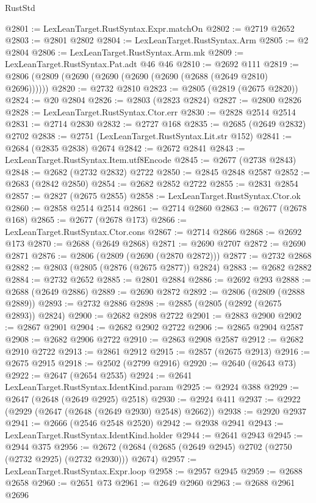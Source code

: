 \begin{lexlean}{RustStd}
\begin{coremodule}
@2801 := LexLeanTarget.RustSyntax.Expr.matchOn
@2802 := @2719 @2652
@2803 := @2801 @2802
@2804 := LexLeanTarget.RustSyntax.Arm
@2805 := @2 @2804
@2806 := LexLeanTarget.RustSyntax.Arm.mk
@2809 := LexLeanTarget.RustSyntax.Pat.adt @46 @46
@2810 := @2692 @111
@2819 := @2806 (@2809 (@2690 (@2690 (@2690 (@2690 (@2688 (@2649 @2810) @2696))))))
@2820 := @2732 @2810
@2823 := @2805 (@2819 (@2675 @2820))
@2824 := @20 @2804
@2826 := @2803 (@2823 @2824)
@2827 := @2800 @2826
@2828 := LexLeanTarget.RustSyntax.Ctor.err
@2830 := @2828 @2514 @2514
@2831 := @2714 @2830
@2832 := @2727 @168
@2835 := @2685 (@2649 @2832) @2702
@2838 := @2751 (LexLeanTarget.RustSyntax.Lit.str @152)
@2841 := @2684 (@2835 @2838) @2674
@2842 := @2672 @2841
@2843 := LexLeanTarget.RustSyntax.Item.utf8Encode
@2845 := @2677 (@2738 @2843)
@2848 := @2682 (@2732 @2832) @2722
@2850 := @2845 @2848 @2587
@2852 := @2683 (@2842 @2850)
@2854 := @2682 @2852 @2722
@2855 := @2831 @2854
@2857 := @2827 (@2675 @2855)
@2858 := LexLeanTarget.RustSyntax.Ctor.ok
@2860 := @2858 @2514 @2514
@2861 := @2714 @2860
@2863 := @2677 (@2678 @168)
@2865 := @2677 (@2678 @173)
@2866 := LexLeanTarget.RustSyntax.Ctor.cons
@2867 := @2714 @2866
@2868 := @2692 @173
@2870 := @2688 (@2649 @2868)
@2871 := @2690 @2707
@2872 := @2690 @2871
@2876 := @2806 (@2809 (@2690 (@2870 @2872)))
@2877 := @2732 @2868
@2882 := @2803 (@2805 (@2876 (@2675 @2877)) @2824)
@2883 := @2682 @2882
@2884 := @2732 @2652
@2885 := @2801 @2884
@2886 := @2692 @293
@2888 := @2688 (@2649 @2886)
@2889 := @2690 @2872
@2892 := @2806 (@2809 (@2888 @2889))
@2893 := @2732 @2886
@2898 := @2885 (@2805 (@2892 (@2675 @2893)) @2824)
@2900 := @2682 @2898 @2722
@2901 := @2883 @2900
@2902 := @2867 @2901
@2904 := @2682 @2902 @2722
@2906 := @2865 @2904 @2587
@2908 := @2682 @2906 @2722
@2910 := @2863 @2908 @2587
@2912 := @2682 @2910 @2722
@2913 := @2861 @2912
@2915 := @2857 (@2675 @2913)
@2916 := @2675 @2915
@2918 := @2502 (@2799 @2916)
@2920 := @2640 (@2643 @73)
@2922 := @2647 (@2654 @2535)
@2924 := @2641 LexLeanTarget.RustSyntax.IdentKind.param
@2925 := @2924 @388
@2929 := @2647 (@2648 (@2649 @2925) @2518)
@2930 := @2924 @411
@2937 := @2922 (@2929 (@2647 (@2648 (@2649 @2930) @2548) @2662))
@2938 := @2920 @2937
@2941 := @2666 (@2546 @2548 @2520)
@2942 := @2938 @2941
@2943 := LexLeanTarget.RustSyntax.IdentKind.holder
@2944 := @2641 @2943
@2945 := @2944 @375
@2956 := @2672 (@2684 (@2685 (@2649 @2945) @2702 (@2750 (@2732 @2925) (@2732 @2930))) @2674)
@2957 := LexLeanTarget.RustSyntax.Expr.loop
@2958 := @2957 @2945
@2959 := @2688 @2658
@2960 := @2651 @73
@2961 := @2649 @2960
@2963 := @2688 @2961 @2696

\end{coremodule}
\end{lexlean}
